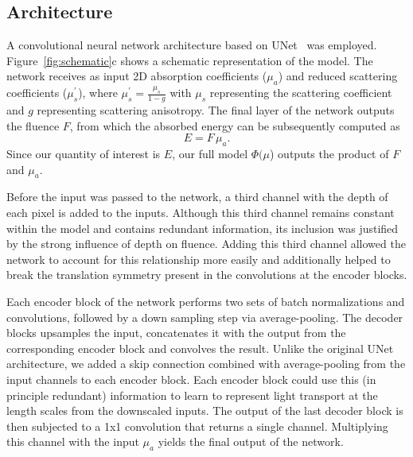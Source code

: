 \documentclass[journal,twoside,web]{ieeecolor}
\begin{document}
\subsection{Architecture}
A convolutional neural network architecture based on UNet~\cite{UNet} was employed. %
Figure~\ref{fig:schematic}c shows a schematic representation of the model. %
The network receives as input 2D absorption coefficients ($\mu_a$) and reduced scattering coefficients ($\mu_s^\prime$), where $\mu_s^\prime=\frac{\mu_s}{1-g}$ with $\mu_s$ representing the scattering coefficient and $g$ representing scattering anisotropy. %
The final layer of the network outputs the fluence $F$, from which the absorbed energy  can be subsequently computed as
\begin{equation}
    E = F\,\mu_a.
    \label{eq:fluence}
\end{equation}
Since our quantity of interest is $E$, our full model $\Phi(\mu$) outputs the product of $F$ and $\mu_a$.
\par
Before the input was passed to the network, a third channel with the depth of each pixel is added to the inputs. %
Although this third channel remains constant within the model and contains redundant information, its inclusion was justified by the strong influence of depth on fluence. %
Adding this third channel allowed the network to account for this relationship more easily and additionally helped to break the translation symmetry present in the convolutions at the encoder blocks.
\par
Each encoder block of the network performs two sets of batch normalizations and convolutions, followed by a down sampling step via average-pooling. %
The decoder blocks upsamples the input, concatenates it with the output from the corresponding encoder block and convolves the result. %
Unlike the original UNet architecture, we added a skip connection combined with average-pooling from the input channels to each encoder block. %
Each encoder block could use this (in principle redundant) information to learn to represent light transport at the length scales from the downscaled inputs. %
The output of the last decoder block is then subjected to a 1x1 convolution that returns a single channel. %
Multiplying this channel with the input $\mu_a$ yields the final output of the network.
\end{document}
